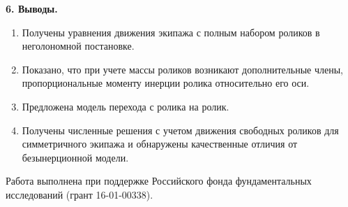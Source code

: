 {\bf 6. Выводы.}
\begin{enumerate}[wide]
    \item Получены уравнения движения экипажа с полным набором роликов в неголономной постановке.

    \item Показано, что при учете массы роликов возникают дополнительные члены, пропорциональные моменту инерции ролика относительно его оси.

    \item Предложена модель перехода с ролика на ролик.

    \item Получены численные решения с учетом движения свободных роликов для симметричного экипажа и обнаружены качественные отличия от безынерционной модели.
\end{enumerate}

Работа выполнена при поддержке Российского фонда фундаментальных исследований (грант 16-01-00338).